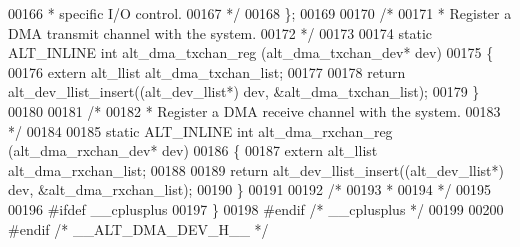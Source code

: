 \begin{DoxyCode}
00166 \textcolor{comment}{              * specific I/O control.}
00167 \textcolor{comment}{                                      */} 
00168 \};
00169 
00170 \textcolor{comment}{/*}
00171 \textcolor{comment}{ * Register a DMA transmit channel with the system.}
00172 \textcolor{comment}{ */}
00173 
00174 \textcolor{keyword}{static} ALT_INLINE \textcolor{keywordtype}{int} alt_dma_txchan_reg (alt_dma_txchan_dev* dev)
00175 \{
00176   \textcolor{keyword}{extern} alt_llist alt\_dma\_txchan\_list;
00177 
00178   \textcolor{keywordflow}{return} alt_dev_llist_insert((alt_dev_llist*) dev, &alt\_dma\_txchan\_list);
00179 \}
00180 
00181 \textcolor{comment}{/*}
00182 \textcolor{comment}{ * Register a DMA receive channel with the system.}
00183 \textcolor{comment}{ */}
00184 
00185 \textcolor{keyword}{static} ALT_INLINE \textcolor{keywordtype}{int} alt_dma_rxchan_reg (alt_dma_rxchan_dev* dev)
00186 \{
00187   \textcolor{keyword}{extern} alt_llist alt\_dma\_rxchan\_list;
00188 
00189   \textcolor{keywordflow}{return} alt_dev_llist_insert((alt_dev_llist*) dev, &alt\_dma\_rxchan\_list);
00190 \}
00191 
00192 \textcolor{comment}{/*}
00193 \textcolor{comment}{ *}
00194 \textcolor{comment}{ */}
00195 
00196 \textcolor{preprocessor}{#ifdef \_\_cplusplus}
00197 \}
00198 \textcolor{preprocessor}{#endif }\textcolor{comment}{/* \_\_cplusplus */}\textcolor{preprocessor}{}
00199 
00200 \textcolor{preprocessor}{#endif }\textcolor{comment}{/* \_\_ALT\_DMA\_DEV\_H\_\_ */}\textcolor{preprocessor}{}
\end{DoxyCode}

